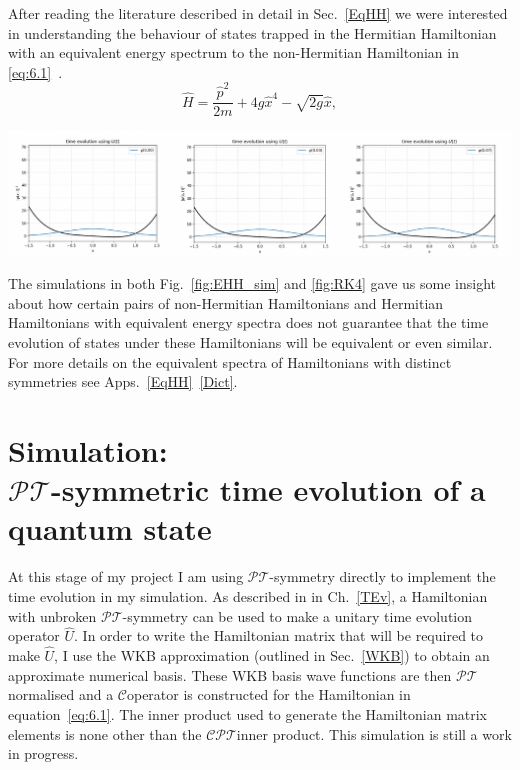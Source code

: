 \documentclass[12pt, a4paper]{report}
\newenvironment{Figure}
    {\par\medskip\noindent\minipage{\linewidth}}
    {\endminipage\par\medskip}
\newcommand\PT{\(\mathcal{PT}\)}
\newcommand\CC{\(\mathcal{C}\)}
\begin{document}
After reading the literature described in detail in Sec.~\ref{EqHH} we were interested in understanding the behaviour of states trapped in the Hermitian Hamiltonian with an equivalent energy spectrum to the non-Hermitian Hamiltonian in \ref{eq:6.1}~\cite{HHEquivalent, Equivalent_withanomaly, ParityAnomaly}. 
\begin{equation}\label{eq:6.3}
\hat{H} = \frac{\hat{p}^2}{2m} + 4g\hat{x}^4 - \sqrt{2g}\hat{x},
\end{equation}
\begin{Figure}
\centering
\includegraphics[width=\linewidth]{EHH_sim.pdf}
\label{fig:EHH_sim}
\end{Figure}
The simulations in both Fig.~\ref{fig:EHH_sim} and \ref{fig:RK4} gave us some insight about how certain pairs of non-Hermitian Hamiltonians and Hermitian Hamiltonians with equivalent energy spectra does not guarantee that the time evolution of states under these Hamiltonians will be equivalent or even similar. For more details on the equivalent spectra of Hamiltonians with distinct symmetries see Apps.~\ref{EqHH}~\ref{Dict}.


\section{Simulation:\\ \PT-symmetric time evolution of a quantum state}
At this stage of my project I am using \PT-symmetry directly to implement the time evolution in my simulation. As described in in Ch.~\ref{TEv}, a Hamiltonian with unbroken \PT-symmetry can be used to make a unitary time evolution operator $\hat{U}$. In order to write the Hamiltonian matrix that will be required to make $\hat{U}$, I use the WKB approximation (outlined in Sec.~\ref{WKB}) to obtain an approximate numerical basis. These WKB basis wave functions are then \PT\:normalised and a \CC\:operator is constructed for the Hamiltonian in equation~\ref{eq:6.1}. The inner product used to generate the Hamiltonian matrix elements is none other than the \CC\PT\:inner product. This simulation is still a work in progress. 
\end{document}
